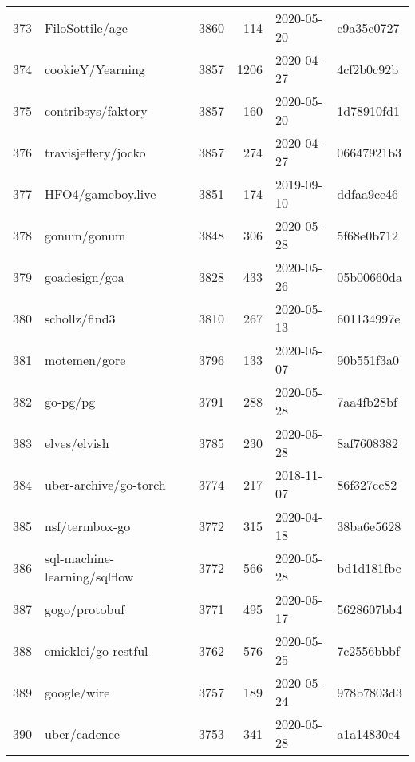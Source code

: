 \begin{longtable}{llrrll}
    373 &                                    FiloSottile/age &   3860 &    114 & 2020-05-20 &  c9a35c0727 \\
    374 &                                   cookieY/Yearning &   3857 &   1206 & 2020-04-27 &  4cf2b0c92b \\
    375 &                                 contribsys/faktory &   3857 &    160 & 2020-05-20 &  1d78910fd1 \\
    376 &                                travisjeffery/jocko &   3857 &    274 & 2020-04-27 &  06647921b3 \\
    377 &                                  HFO4/gameboy.live &   3851 &    174 & 2019-09-10 &  ddfaa9ce46 \\
    378 &                                        gonum/gonum &   3848 &    306 & 2020-05-28 &  5f68e0b712 \\
    379 &                                      goadesign/goa &   3828 &    433 & 2020-05-26 &  05b00660da \\
    380 &                                      schollz/find3 &   3810 &    267 & 2020-05-13 &  601134997e \\
    381 &                                       motemen/gore &   3796 &    133 & 2020-05-07 &  90b551f3a0 \\
    382 &                                           go-pg/pg &   3791 &    288 & 2020-05-28 &  7aa4fb28bf \\
    383 &                                       elves/elvish &   3785 &    230 & 2020-05-28 &  8af7608382 \\
    384 &                              uber-archive/go-torch &   3774 &    217 & 2018-11-07 &  86f327cc82 \\
    385 &                                     nsf/termbox-go &   3772 &    315 & 2020-04-18 &  38ba6e5628 \\
    386 &                       sql-machine-learning/sqlflow &   3772 &    566 & 2020-05-28 &  bd1d181fbc \\
    387 &                                      gogo/protobuf &   3771 &    495 & 2020-05-17 &  5628607bb4 \\
    388 &                                emicklei/go-restful &   3762 &    576 & 2020-05-25 &  7c2556bbbf \\
    389 &                                        google/wire &   3757 &    189 & 2020-05-24 &  978b7803d3 \\
    390 &                                       uber/cadence &   3753 &    341 & 2020-05-28 &  a1a14830e4 \\

\end{longtable}
